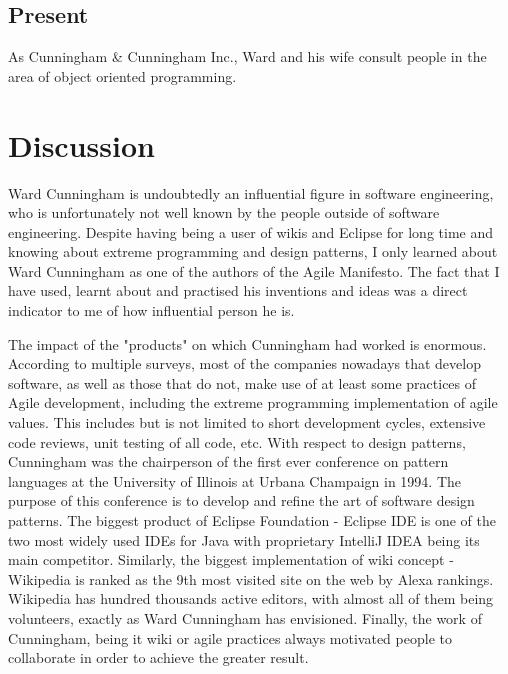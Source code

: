 \documentclass[11pt]{article}
\begin{document}
\subsection{Present}
As Cunningham  \& Cunningham  Inc., Ward and  his  wife consult people in the area of object oriented programming.


\section{Discussion}
Ward Cunningham is undoubtedly an influential figure in software engineering, who is unfortunately not well known by the people outside of software engineering. Despite having being a user of wikis and Eclipse for long time and knowing about extreme programming and design patterns, I only learned about Ward Cunningham as one of the authors of the Agile Manifesto. The fact that I have used, learnt about and practised his inventions and ideas was a direct indicator to me of how influential person he is.
\par
The impact of the "products" on which Cunningham had worked is enormous. According to multiple surveys\cite{hp-agile-report}\cite{pmi-agile-report}\cite{state-of-agile-report}, most of the companies nowadays that develop software, as well as those that do not, make use of at least some practices of Agile development, including the extreme programming implementation of agile values. This includes but is not limited to short development cycles, extensive code reviews, unit testing of all code, etc.
With respect to design  patterns, Cunningham was the chairperson of the first ever conference on pattern languages at the University of Illinois at Urbana Champaign in 1994.\cite{cs-encyclopedia} The purpose of this conference is to develop and refine the art of software design patterns.
The biggest product of Eclipse Foundation - Eclipse IDE is one of the two most widely used IDEs for Java with proprietary IntelliJ IDEA being its main competitor.\cite{rebellabse-report} Similarly, the biggest implementation of wiki concept - Wikipedia is ranked as the 9th most visited site on the web by Alexa rankings. Wikipedia has hundred thousands active editors\cite{wiki-community}, with almost all of them being volunteers, exactly as Ward Cunningham has envisioned. Finally, the work of Cunningham, being it wiki or agile practices always motivated people to collaborate in order to achieve the greater result.
\end{document}
